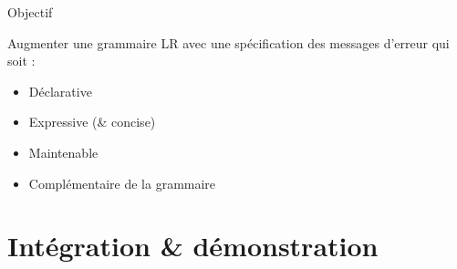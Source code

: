 \documentclass{beamer}          %
\begin{document}
\begin{frame}{Objectif}

  Augmenter une grammaire LR avec une spécification des messages d'erreur qui soit :
  \begin{itemize}
    \item Déclarative
    \item Expressive (\& concise)
    \item Maintenable
    \item Complémentaire de la grammaire
  \end{itemize}
\end{frame}

\section{Intégration \& démonstration}
\end{document}

